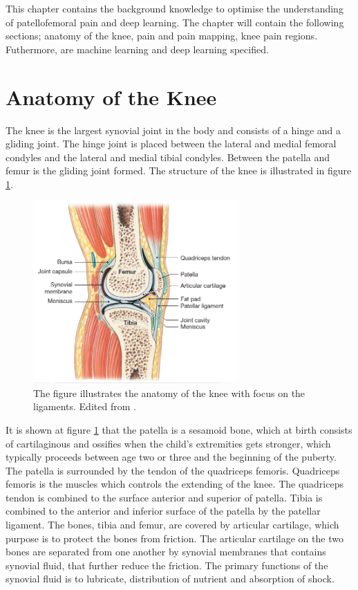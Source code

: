This chapter contains the background knowledge to optimise the understanding of patellofemoral pain and deep learning. The chapter will contain the following sections; anatomy of the knee, pain and pain mapping, knee pain regions. Futhermore, are machine learning and deep learning specified.


\section{Anatomy of the Knee}
The knee is the largest synovial joint in the body and consists of a hinge and a gliding joint. The hinge joint is placed between the lateral and medial femoral condyles and the lateral and medial tibial condyles. Between the patella and femur is the gliding joint formed. The structure of the knee is illustrated in figure \ref{fig:bonestruc}.\citep{Martini2012}

\begin{figure} [H]
\centering
\includegraphics[width=0.7\textwidth]{figures/bonestruc}
\caption{The figure illustrates the anatomy of the knee with focus on the ligaments. Edited from \citep{Martini2012}.}
\label{fig:bonestruc}
\end{figure}

\noindent
It is shown at figure \ref{fig:bonestruc} that the patella is a sesamoid bone, which at birth consists of cartilaginous and ossifies when the child’s extremities gets stronger, which typically proceeds between age two or three and the beginning of the puberty. 
The patella is surrounded by the tendon of the quadriceps femoris. Quadriceps femoris is the muscles which controls the extending of the knee. The quadriceps tendon is combined to the surface anterior and superior of patella. Tibia is combined to the anterior and inferior surface of the patella by the patellar ligament. The bones, tibia and femur, are covered by articular cartilage, which purpose is to protect the bones from friction. The articular cartilage on the two bones are separated from one another by synovial membranes that contains synovial fluid, that further reduce the friction. The primary functions of the synovial fluid is to lubricate, distribution of nutrient and absorption of shock.\citep{Martini2012}

